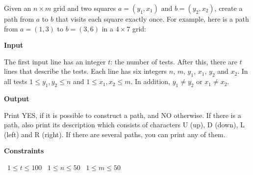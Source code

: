 Given an $n \times m$ grid and two squares $a=(y_1,x_1)$ and $b=(y_2,x_2)$, create a path from $a$ to $b$ that visits each square exactly once.
For example, here is a path from $a=(1,3)$ to $b=(3,6)$ in a $4 \times 7$ grid:

\vspace{0.3cm}\noindent\textbf{Input}

The first input line has an integer $t$: the number of tests.
After this, there are $t$ lines that describe the tests. Each line has six integers $n$, $m$, $y_1$, $x_1$, $y_2$ and $x_2$.
In all tests $1 \le y_1,y_2 \le n$ and $1 \le x_1,x_2 \le m$. In addition, $y_1 \neq y_2$ or $x_1 \neq x_2$.

\vspace{0.3cm}\noindent\textbf{Output}

Print YES, if it is possible to construct a path, and NO otherwise.
If there is a path, also print its description which consists of characters U (up), D (down), L (left) and R (right). If there are several paths, you can print any of them.

\vspace{0.3cm}\noindent\textbf{Constraints}

\textbullet\ $1 \le t \le 100$
\textbullet\ $1 \le n \le 50$
\textbullet\ $1 \le m \le 50$